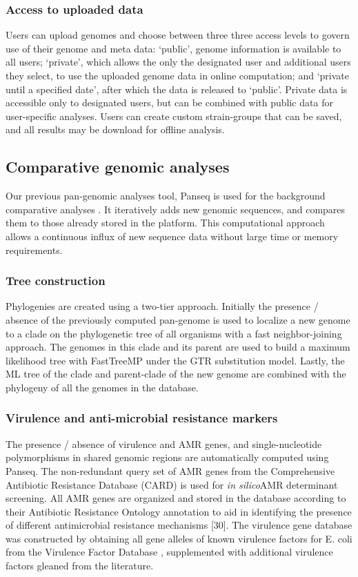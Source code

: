 \documentclass{bmcart}
\begin{document}
\subsubsection{Access to uploaded data}
Users can upload genomes and choose between three three access levels to govern use of their genome and meta data: `public', genome information is available to all users; `private', which allows the only the designated user and additional users they select, to use the uploaded genome data in online computation; and `private until a specified date', after which the data is released to `public'. Private data is accessible only to designated users, but can be combined with public data for user-specific analyses. Users can create custom strain-groups that can be saved, and all results may be download for offline analysis.

\subsection{Comparative genomic analyses}
Our previous pan-genomic analyses tool, Panseq is used for the background comparative analyses \cite{laing_pan-genome_2010}. It iteratively adds new genomic sequences, and compares them to those already stored in the platform. This computational approach allows a continuous influx of new sequence data without large time or memory requirements. 

\subsubsection{Tree construction}
Phylogenies are created using a two-tier approach. Initially the presence / absence of the previously computed pan-genome is used to localize a new genome to a clade on the phylogenetic tree of all organisms with a fast neighbor-joining approach. The genomes in this clade and its parent are used to build a maximum likelihood tree with FastTreeMP under the GTR substitution model. Lastly, the ML tree of the clade and parent-clade of the new genome are combined with the phylogeny of all the genomes in the database.

\subsubsection{Virulence and anti-microbial resistance markers}
The presence / absence of virulence and AMR genes, and single-nucleotide polymorphisms in shared genomic regions are automatically computed using Panseq. The non-redundant query set of AMR genes from the Comprehensive Antibiotic Resistance Database (CARD) \cite{mcarthur_comprehensive_2013} is used for \textit{in silico}AMR determinant screening. All AMR genes are organized and stored in the database according to their Antibiotic Resistance Ontology annotation to aid in identifying the presence of different antimicrobial resistance mechanisms \cite{}[30]. The virulence gene database was constructed by obtaining all gene alleles of known virulence factors for E. coli from the Virulence Factor Database \cite{chen_vfdb_2011}, supplemented with additional virulence factors gleaned from the literature. 
\end{document}
